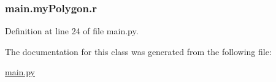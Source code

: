 \subsubsection[{\texorpdfstring{r}{r}}]{\setlength{\rightskip}{0pt plus 5cm}main.\+my\+Polygon.\+r}\hypertarget{classmain_1_1myPolygon_a3a16fc82c5e401d7e6c30cc70325e7e1}{}\label{classmain_1_1myPolygon_a3a16fc82c5e401d7e6c30cc70325e7e1}


Definition at line 24 of file main.\+py.



The documentation for this class was generated from the following file\+:\begin{DoxyCompactItemize}
\item 
\hyperlink{main_8py}{main.\+py}\end{DoxyCompactItemize}
